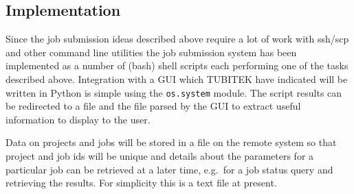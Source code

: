 \subsection{Implementation}

Since the job submission ideas described above require a lot of work with ssh/scp and other command line utilities the job submission system has been implemented as a number of (bash) shell scripts each performing one of the tasks described above. Integration with a GUI which TUBITEK have indicated will be written in Python is simple using the \texttt{os.system} module. The script results can be redirected to a file and the file parsed by the GUI to extract useful information to display to the user.

Data on projects and jobs will be stored in a file on the remote system so that project and job ids will be unique and details about the parameters for a particular job can be retrieved at a later time, e.g.\ for a job status query and retrieving the results. For simplicity this is a text file at present.
